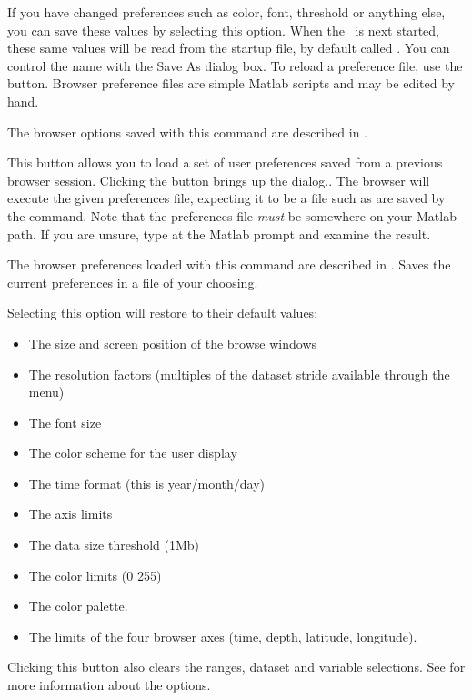 \begin{description}
\label{gui,ref,saveopt-desc}

If you have changed preferences such as color, font, threshold or
anything else, you can save these values by selecting this option.
When the \GUI\ is next started, these same values will be read from
the startup file, by default called .  You can control
the name with the Save As dialog box.  To reload a preference file,
use the  button.  Browser preference files
are simple Matlab scripts and may be edited by hand.

The browser options saved with this command are described in
.


This button allows you to load a set of user preferences saved from a
previous browser session.  Clicking the button brings up the dialog..
The browser will execute the given preferences file, expecting it to
be a file such as are saved by the  command.
Note that the preferences file \emph{must} be somewhere on your Matlab
path.  If you are unsure, type  at the Matlab prompt and
examine the result.

The browser preferences loaded with this command are described in
.
Saves the current preferences in a file of your choosing.


Selecting this option will restore to their default values:

\begin{itemize}

\item
The size and screen position of the browse windows
\item
The resolution factors (multiples of the dataset stride 
available through the  menu)
\item
The font size
\item
The color scheme for the user display
\item
The time format (this is year/month/day)
\item
The axis limits
\item
The data size threshold (1Mb)
\item
The color limits (0 255)
\item
The color palette.
\item
The limits of the four browser axes  (time, depth, latitude, longitude).
\end{itemize}

Clicking this button also clears the ranges, dataset and variable
selections.  See  for more information
about the options.

\end{description}

